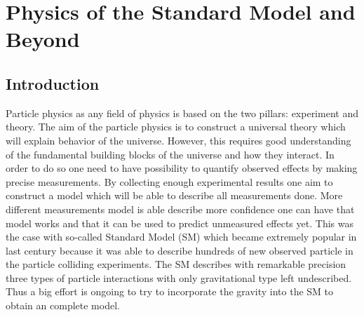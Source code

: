 \chapter{Physics of the Standard Model and Beyond}
\label{chap:Theory}



\section{Introduction}


Particle physics as any field of physics is based on the two pillars: experiment and theory.
The aim of the particle physics is to construct a universal theory which will explain behavior of the universe.
However, this requires good understanding of the fundamental building blocks of the universe and how they interact.
In order to do so one need to have possibility to quantify observed effects by making precise measurements.
By collecting enough experimental results one aim to construct a model which will be able to describe all measurements done.
More different measurements model is able describe more confidence one can have that model works and that it can be used to predict 
unmeasured effects yet. This was the case with so-called Standard Model (SM) which became extremely popular in last century because
it was able to describe hundreds of new observed particle in the particle colliding experiments.
The SM describes with remarkable precision three types of particle interactions with only gravitational type left undescribed.
Thus a big effort is ongoing to try to incorporate the gravity into the SM to obtain an complete model.


